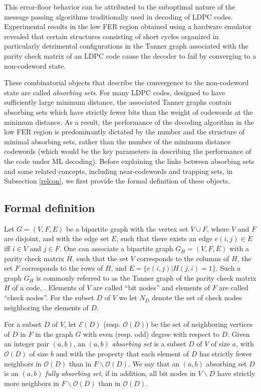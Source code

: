 This error-floor behavior can be attributed to the suboptimal
nature of the message passing
 algorithms traditionally used in decoding of LDPC codes. Experimental results in
 the low FER region obtained using a hardware emulator
 \cite{zhang06} revealed  that certain structures consisting of short cycles
 organized in particularly detrimental configurations in the Tanner
 graph associated with the parity check matrix of an LDPC code
 cause the decoder to fail by converging to a non-codeword state.


These combinatorial objects that describe the convergence to the
non-codeword state  are called \textit{absorbing sets}. For many
LDPC codes, designed to have sufficiently large minimum distance,
the associated Tanner graphs contain absorbing sets which have
strictly fewer bits than the weight of codewords at the minimum
distance. As a result, the performance of the decoding algorithm
in the low FER region is predominantly dictated by the number and
the structure of minimal absorbing sets, rather than the number of
the minimum distance codewords (which would be the key parameters
in describing the performance of the code under ML decoding).
Before explaining the links between absorbing sets and some
related concepts, including near-codewords and trapping sets, in
Subsection \ref{relcon}, we first provide the formal definition of
these objects.

\subsection{Formal definition}\label{absformal}

Let $G=(V,F,E)$ be a bipartite graph with the vertex set $V \cup
F$, where $V$ and $F$ are disjoint, and with the edge set $E$,
such that there exists an edge $e(i,j) \in E$ iff $i\in V$ and
$j\in F$. One can associate a bipartite graph $G_H=(V,F,E)$ with a
parity check matrix $H$, such that the set $V$ corresponds to the
columns of $H$, the set $F$ corresponds to the rows of $H$, and
$E=\{ e(i,j)| H(j,i)=1\}$. Such a graph $G_H$ is commonly referred
to as the Tanner graph of the parity check matrix $H$ of a code,
\cite{forney}. Elements of $V$ are called ``bit nodes'' and
elements of $F$ are called ``check nodes''. %
For the subset
$D$ of $V$ we let $N_D$ denote the set of check nodes neighboring
the elements of $D$.

For a subset $D$ of $V$, let $\mathcal{E}(D)$ (resp.
$\mathcal{O}(D)$) be the set of neighboring vertices of $D$ in $F$
in the graph $G$ with even (resp. odd) degree with respect to $D$.
Given an integer pair $(a,b)$, an $(a,b)$ \emph{absorbing set} is
a subset $D$ of $V$ of size $a$, with $\mathcal{O}(D)$ of size $b$
and with the property that each element of $D$ has strictly fewer
neighbors in $\mathcal{O}(D)$ than in $F\backslash
\mathcal{O}(D)$. We say that an $(a,b)$ absorbing set $D$ is an
$(a,b)$ \emph{fully absorbing set}, if in addition, all bit nodes
in $V\backslash D$ have strictly more neighbors in $F\backslash
\mathcal{O}(D)$ than in $\mathcal{O}(D)$.

